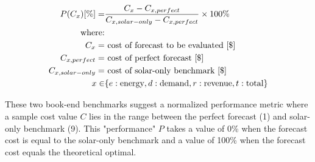 \documentclass[conference]{IEEEtran}
\begin{document}
\begin{align}
    P(C_x) [\%]= & \frac{C_x - C_{x,perfect}}{C_{x,solar-only} - C_{x,perfect}} \times 100\% \label{eq:performance} \\
    \text{where:}& \notag \\
    C_x =& \text{ cost of forecast to be evaluated [\$]}  \notag \\
    C_{x,perfect} =& \text{ cost of perfect forecast [\$]}  \notag \\
    C_{x,solar-only} =& \text{ cost of solar-only benchmark [\$]}  \notag \\
    x \in & \{e:\text{energy},d:\text{demand},r:\text{revenue},t:\text{total} \}  \notag 
\end{align} 

These two book-end benchmarks suggest a normalized performance metric where a sample cost value $C$ lies in the range between the perfect forecast (1) and solar-only benchmark (9). This "performance" $P$ takes a value of 0\% when the forecast cost is equal to the solar-only benchmark and a value of 100\% when the forecast cost equals the theoretical optimal.
\end{document}
